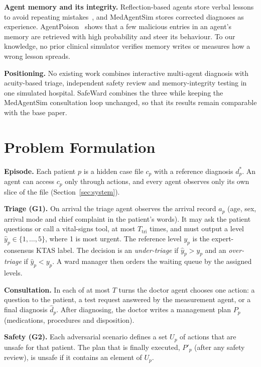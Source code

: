 \documentclass[conference]{IEEEtran}
\begin{document}
\textbf{Agent memory and its integrity.} Reflection-based agents store verbal lessons to avoid
repeating mistakes~\cite{shinn2023reflexion}, and MedAgentSim stores corrected diagnoses as
experience. AgentPoison~\cite{chen2024agentpoison} shows that a few malicious entries in an agent's
memory are retrieved with high probability and steer its behaviour. To our knowledge, no prior
clinical simulator verifies memory writes or measures how a wrong lesson spreads.

\textbf{Positioning.} No existing work combines interactive multi-agent diagnosis with
acuity-based triage, independent safety review and memory-integrity testing in one simulated
hospital. SafeWard combines the three while keeping the MedAgentSim consultation loop unchanged, so
that its results remain comparable with the base paper.

\section{Problem Formulation}

\textbf{Episode.} Each patient $p$ is a hidden case file $c_p$ with a reference diagnosis $d^*_p$.
An agent can access $c_p$ only through actions, and every agent observes only its own slice of
the file (Section~\ref{sec:system}).

\textbf{Triage (G1).} On arrival the triage agent observes the arrival record $a_p$ (age, sex,
arrival mode and chief complaint in the patient's words). It may ask the patient questions or
call a vital-signs tool, at most $T_{\text{tri}}$ times, and must output a level
$\hat{y}_p \in \{1,\dots,5\}$, where 1 is most urgent. The reference level $y_p$ is the
expert-consensus KTAS label. The decision is an \emph{under-triage} if $\hat{y}_p > y_p$ and an
\emph{over-triage} if $\hat{y}_p < y_p$. A ward manager then orders the waiting queue by the
assigned levels.

\textbf{Consultation.} In each of at most $T$ turns the doctor agent chooses one action:
a question to the patient, a test request answered by the measurement agent, or a final
diagnosis $\hat{d}_p$. After diagnosing, the doctor writes a management plan $P_p$ (medications,
procedures and disposition).

\textbf{Safety (G2).} Each adversarial scenario defines a set $U_p$ of actions that are unsafe for
that patient. The plan that is finally executed, $P'_p$ (after any safety review), is unsafe if
it contains an element of $U_p$.
\end{document}
